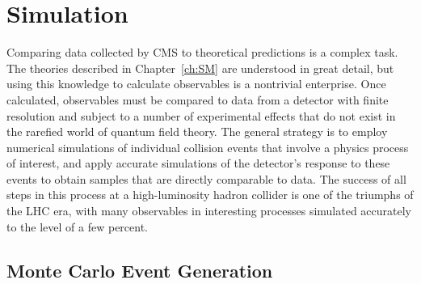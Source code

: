 
\chapter{Simulation}\label{ch:simulation}

Comparing data collected by CMS to theoretical predictions is a complex task.
The theories described in Chapter~\ref{ch:SM} are understood in great detail, but using this knowledge to calculate observables is a nontrivial enterprise.
Once calculated, observables must be compared to data from a detector with finite resolution and subject to a number of experimental effects that do not exist in the rarefied world of quantum field theory.
The general strategy is to employ numerical simulations of individual collision events that involve a physics process of interest, and apply accurate simulations of the detector's response to these events to obtain samples that are directly comparable to data.
The success of all steps in this process at a high-luminosity hadron collider is one of the triumphs of the LHC era, with many observables in interesting processes simulated accurately to the level of a few percent.



\section{Monte Carlo Event Generation}

